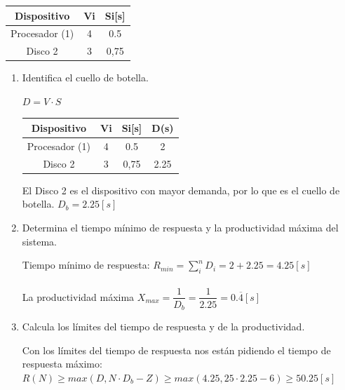 \begin{table}[H]\centering
\begin{tabular}{|c|c|c|}
\hline
\textbf{Dispositivo}    & \textbf{Vi} & \textbf{Si[s]} \\ \hline
Procesador (1) & 4  & 0.5    \\ \hline
Disco 2        & 3  & 0,75   \\ \hline
\end{tabular}
\end{table}

\begin{enumerate}
    \item Identifica el cuello de botella.
    \begin{tcolorbox}[colback=white,colframe=cyan!50!black,fonttitle=\bfseries]
    $D=V\cdot S$
        \begin{table}[H]\centering
        \begin{tabular}{|c|c|c|c|}\hline
        \textbf{Dispositivo}    & \textbf{Vi} & \textbf{Si[s]} & \textbf{D(s)}\\ \hline
        Procesador (1) & 4  & 0.5  & 2   \\ \hline
        Disco 2        & 3  & 0,75  & 2.25  \\ \hline
        \end{tabular}\end{table}
        El Disco 2 es el dispositivo con mayor demanda, por lo que es el cuello de botella.
        $D_b = 2.25[s]$
    \end{tcolorbox}
    \item Determina el tiempo mínimo de respuesta y la productividad máxima del sistema.
    \begin{tcolorbox}[colback=white,colframe=cyan!50!black,fonttitle=\bfseries]
    Tiempo mínimo de respuesta: $R_{min}=\sum_i^nD_i=2+2.25=4.25[s]$\\\\
    La productividad máxima $X_{max} = \dfrac{1}{D_b}=\dfrac{1}{2.25}=0.\overline{4}[s]$
    \end{tcolorbox}
    \item Calcula los límites del tiempo de respuesta y de la productividad.
    \begin{tcolorbox}[colback=white,colframe=cyan!50!black,fonttitle=\bfseries]
    Con los límites del tiempo de respuesta nos están pidiendo el tiempo de respuesta máximo: \\$R(N)\geq max(D, N\cdot D_b-Z) \geq max(4.25, 25\cdot2.25-6) \geq 50.25[s]$\\\\

\end{tcolorbox}
\end{enumerate}
